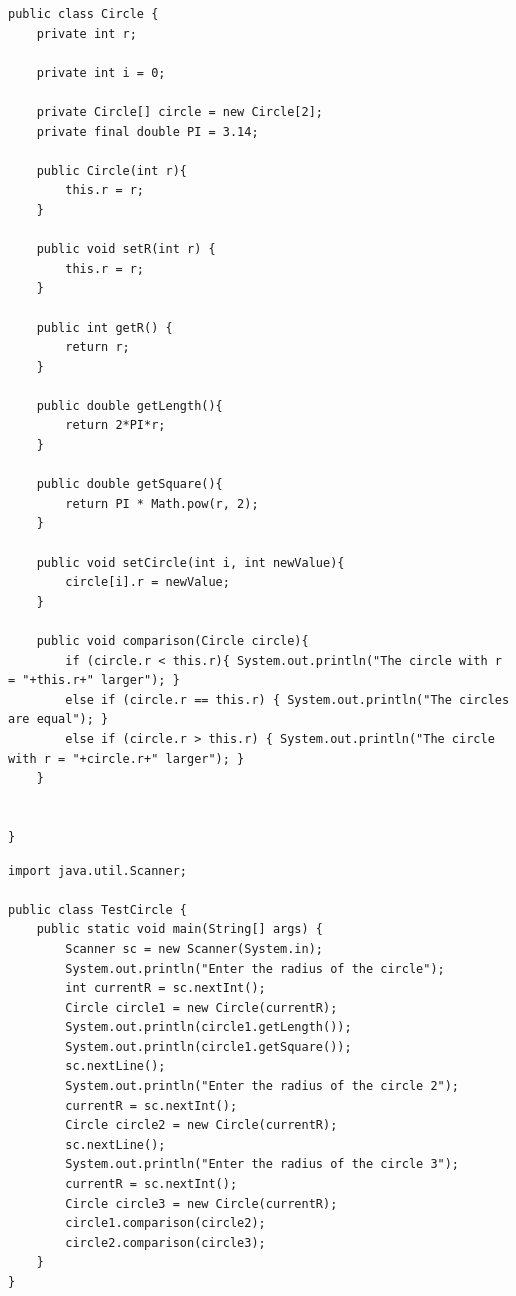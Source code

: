 \documentclass[14pt, a4paper]{extarticle}
\newenvironment{code}{\captionsetup{type=listing}}{}
\begin{document}
\begin{code}
\begin{Verbatim}[frame=single, fontsize=\footnotesize]
public class Circle {
    private int r;

    private int i = 0;

    private Circle[] circle = new Circle[2];
    private final double PI = 3.14;

    public Circle(int r){
        this.r = r;
    }

    public void setR(int r) {
        this.r = r;
    }

    public int getR() {
        return r;
    }

    public double getLength(){
        return 2*PI*r;
    }

    public double getSquare(){
        return PI * Math.pow(r, 2);
    }

    public void setCircle(int i, int newValue){
        circle[i].r = newValue;
    }

    public void comparison(Circle circle){
        if (circle.r < this.r){ System.out.println("The circle with r = "+this.r+" larger"); }
        else if (circle.r == this.r) { System.out.println("The circles are equal"); }
        else if (circle.r > this.r) { System.out.println("The circle with r = "+circle.r+" larger"); }
    }


}
\end{Verbatim}
\end{code}
\begin{code}
\begin{Verbatim}[frame=single, fontsize=\footnotesize]
import java.util.Scanner;

public class TestCircle {
    public static void main(String[] args) {
        Scanner sc = new Scanner(System.in);
        System.out.println("Enter the radius of the circle");
        int currentR = sc.nextInt();
        Circle circle1 = new Circle(currentR);
        System.out.println(circle1.getLength());
        System.out.println(circle1.getSquare());
        sc.nextLine();
        System.out.println("Enter the radius of the circle 2");
        currentR = sc.nextInt();
        Circle circle2 = new Circle(currentR);
        sc.nextLine();
        System.out.println("Enter the radius of the circle 3");
        currentR = sc.nextInt();
        Circle circle3 = new Circle(currentR);
        circle1.comparison(circle2);
        circle2.comparison(circle3);
    }
}
\end{Verbatim}
\end{code}
\end{document}
